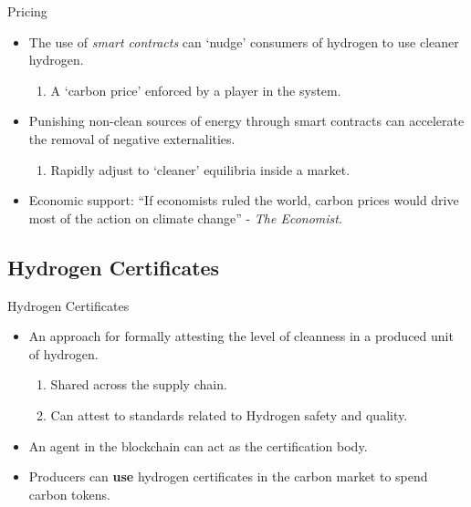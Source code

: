 \begin{frame}{Pricing}
    \begin{itemize}
        \item The use of \textit{smart contracts} can `nudge' consumers of
              hydrogen to use cleaner hydrogen.
              \begin{enumerate}
                  \item A `carbon price' enforced by a player in the system.
              \end{enumerate}
        \item Punishing non-clean sources of energy through smart contracts
              can accelerate the removal of negative externalities.
              \begin{enumerate}
                  \item Rapidly adjust to `cleaner' equilibria inside a market.
              \end{enumerate}
        \item Economic support: ``If economists ruled the world, carbon
              prices would drive most of the action on climate change''
              - \textit{The Economist}.
    \end{itemize}
\end{frame}
\subsection{Hydrogen Certificates}
\begin{frame}{Hydrogen Certificates}
    \begin{itemize}
        \item An approach for formally attesting the level of cleanness in
              a produced unit of hydrogen.
              \begin{enumerate}
                  \item Shared across the supply chain.
                  \item Can attest to standards related to Hydrogen
                        safety and quality.
              \end{enumerate}
        \item An agent in the blockchain can act as the certification body.
        \item Producers can \textbf{use} hydrogen certificates in the carbon
              market to spend carbon tokens.
    \end{itemize}
\end{frame}

